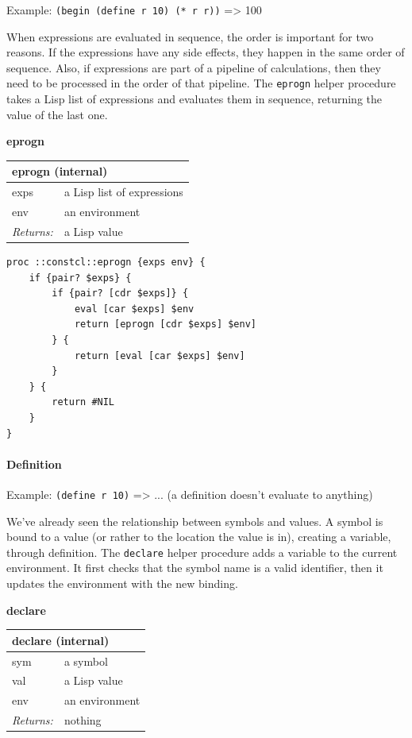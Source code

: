 \documentclass[twoside,9pt]{report}
\begin{document}
Example: \texttt{(begin (define r 10) (* r r))} => 100


When expressions are evaluated in sequence, the order is important for two reasons. If the expressions have any side effects, they happen in the same order of sequence. Also, if expressions are part of a pipeline of calculations, then they need to be processed in the order of that pipeline. The \texttt{eprogn} helper procedure takes a Lisp list of expressions and evaluates them in sequence, returning the value of the last one.


\textbf{eprogn}

\begin{tabular}{ |l l| }
\hline
\multicolumn{2}{|l|}{eprogn (internal)} \\
\hline
exps & a Lisp list of expressions \\
env & an environment \\
\textit{Returns:} & a Lisp value \\
\hline
\end{tabular}

\noindent\makebox[\linewidth]{\rule{\linewidth}{0.4pt}}
\begin{lstlisting}
proc ::constcl::eprogn {exps env} {
    if {pair? $exps} {
        if {pair? [cdr $exps]} {
            eval [car $exps] $env
            return [eprogn [cdr $exps] $env]
        } {
            return [eval [car $exps] $env]
        }
    } {
        return #NIL
    }
}
\end{lstlisting}
\noindent\makebox[\linewidth]{\rule{\linewidth}{0.4pt}}
\paragraph{Definition}
\label{definition}

Example: \texttt{(define r 10)} => ... (a definition doesn't evaluate to anything)


We've already seen the relationship between symbols and values. A symbol is bound to a value (or rather to the location the value is in), creating a variable, through definition. The \texttt{declare} helper procedure adds a variable to the current environment. It first checks that the symbol name is a valid identifier, then it updates the environment with the new binding.


\textbf{declare}

\begin{tabular}{ |l l| }
\hline
\multicolumn{2}{|l|}{declare (internal)} \\
\hline
sym & a symbol \\
val & a Lisp value \\
env & an environment \\
\textit{Returns:} & nothing \\
\hline
\end{tabular}
\end{document}
